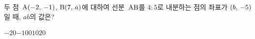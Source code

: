 두 점~$\mathrm{A}(-2,\mkern3mu -1)$, $\mathrm{B}(7,\mkern3mu a)$에 대하여 선분~$\mathrm{AB}$를 $4:5$로 내분하는 점의 좌표가 $(b,\mkern3mu -5)$일 때, $ab$의 값은?
\begin{choices32}{$-20$}{$-10$}{$0$}{$10$}{$20$}\end{choices32}
